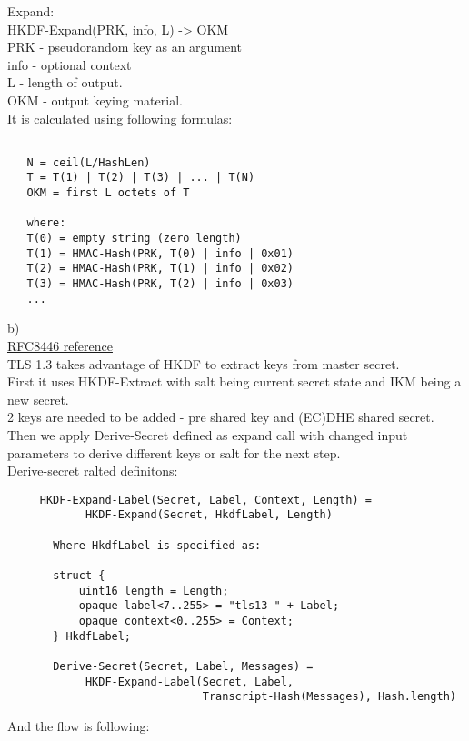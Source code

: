 \documentclass[a4paper]{article}
\begin{document}
Expand:\\
HKDF-Expand(PRK, info, L) -> OKM\\
PRK - pseudorandom key as an argument\\
info - optional context\\
L - length of output.\\
OKM - output keying material.\\
It is calculated using following formulas:\\
\begin{verbatim}

   N = ceil(L/HashLen)
   T = T(1) | T(2) | T(3) | ... | T(N)
   OKM = first L octets of T

   where:
   T(0) = empty string (zero length)
   T(1) = HMAC-Hash(PRK, T(0) | info | 0x01)
   T(2) = HMAC-Hash(PRK, T(1) | info | 0x02)
   T(3) = HMAC-Hash(PRK, T(2) | info | 0x03)
   ...
\end{verbatim}
b)\\
\href{https://tools.ietf.org/html/rfc8446}{RFC8446 reference}\\
TLS 1.3 takes advantage of HKDF to extract keys from master secret.\\
First it uses HKDF-Extract with salt  being current secret state and IKM being a new secret.\\
2 keys are needed to be added - pre shared key and (EC)DHE shared secret.\\
Then we apply Derive-Secret defined as expand call with changed input parameters to derive different keys or salt for the next step.\\
Derive-secret ralted definitons:\\
\begin{verbatim}
     HKDF-Expand-Label(Secret, Label, Context, Length) =
            HKDF-Expand(Secret, HkdfLabel, Length)

       Where HkdfLabel is specified as:

       struct {
           uint16 length = Length;
           opaque label<7..255> = "tls13 " + Label;
           opaque context<0..255> = Context;
       } HkdfLabel;

       Derive-Secret(Secret, Label, Messages) =
            HKDF-Expand-Label(Secret, Label,
                              Transcript-Hash(Messages), Hash.length)
\end{verbatim}
And the flow is following:\\
\end{document}
